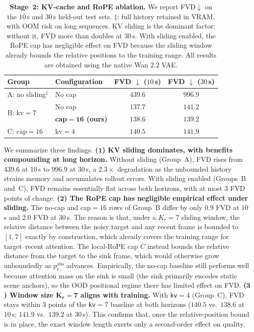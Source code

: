 \begin{table}[h]
  \caption{\textbf{Stage~$\mathbf{2}$: KV-cache and RoPE ablation.} We report FVD$\downarrow$ on the $10$\,s and $30$\,s held-out test sets. $\ddagger$: full history retained in VRAM, with OOM risk on long sequences. KV sliding is the dominant factor: without it, FVD more than doubles at $30$\,s. With sliding enabled, the RoPE cap has negligible effect on FVD because the sliding window already bounds the 
  relative positions to the training range. All results are obtained using the native Wan $2.2$ VAE.}
  \label{tab:kvcache}
  \centering
  \setlength{\tabcolsep}{10pt}
  \begin{tabular}{llcc}
    \toprule
    Group & Configuration & FVD $\downarrow$ ($10$\,s) & FVD $\downarrow$ ($30$\,s) \\
    \midrule
    A: no sliding$^\ddagger$ & No cap                                 & $439.6$          & $996.9$          \\
    \midrule
    \multirow{2}{*}{B: kv$=7$}
                             & No cap                                 & $137.7$          & $141.2$          \\
                             & \textbf{cap$\mathbf{=16}$ (ours)}      & $\mathbf{138.6}$ & $\mathbf{139.2}$ \\
    \midrule
    C: cap$=16$              & kv$=4$                                 & $140.5$          & $141.9$          \\
    \bottomrule
  \end{tabular}
\end{table}

We summarize three findings.
\textbf{($\mathbf{1}$) KV sliding dominates, with benefits compounding at long horizon.}
Without sliding (Group~A), FVD rises from $439.6$ at $10$\,s to $996.9$ at $30$\,s, a $2.3\times$ degradation as the unbounded history strains memory and accumulates rollout errors. With sliding enabled (Groups~B and~C), FVD remains essentially flat across both horizons, with at most $3$ FVD points of change.
\textbf{($\mathbf{2}$) The RoPE cap has negligible empirical effect under sliding.}
The no-cap and cap$=16$ rows of Group~B differ by only $0.9$ FVD at $10$\,s and $2.0$ 
FVD at $30$\,s. The reason is that, 
under a $K_r = 7$ sliding window, the relative distance between the noisy target and any recent 
frame is bounded to $[1, 7]$ exactly by construction, 
which already covers the training range for target--recent attention.
The local-RoPE cap $C$ instead bounds the relative distance from the target to the sink frame, 
which would otherwise grow unboundedly as $p_t^{\mathrm{abs}}$ advances.
Empirically, the no-cap baseline still performs well because attention mass on the sink is small 
(the sink primarily encodes static scene anchors), so the OOD positional regime there has 
limited effect on FVD.
\textbf{($\mathbf{3}$) Window size $\mathbf{K_r=7}$ aligns with training.}
With \texttt{kv}$=4$ (Group~C), FVD stays within $3$ points of the \texttt{kv}$=7$ baseline at both horizons ($140.5$ vs.\ $138.6$ at $10$\,s; $141.9$ vs.\ $139.2$ at $30$\,s). This confirms that, once the relative-position bound is in place, the exact window length exerts only a second-order effect on quality.

